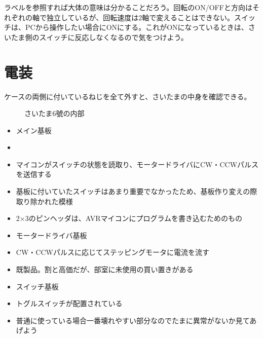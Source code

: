 \documentclass[letterpaper,10pt,dvipdfmx]{sphinxmanual}
\begin{document}
ラベルを参照すれば大体の意味は分かることだろう。回転のON/OFFと方向はそれぞれの軸で独立しているが、回転速度は2軸で変えることはできない。スイッチは、PCから操作したい場合にONにする。これがONになっているときは、さいたま側のスイッチに反応しなくなるので気をつけよう。


\section{電装}
\label{\detokenize{nissyu-idohen/saitama:id5}}
ケースの両側に付いているねじを全て外すと、さいたまの中身を確認できる。
\begin{figure}[htbp]
\centering
\capstart

\noindent{}
\caption{さいたま6號の内部}\label{\detokenize{nissyu-idohen/saitama:id11}}\end{figure}
\begin{itemize}
\item {} 
メイン基板

\item {} 

\item {} 
マイコンがスイッチの状態を読取り、モータードライバにCW・CCWパルスを送信する

\item {} 
基板に付いていたスイッチはあまり重要でなかったため、基板作り変えの際取り除かれた模様

\item {} 
2×3のピンヘッダは、AVRマイコンにプログラムを書き込むためのもの

\item {} 
モータードライバ基板

\item {} 
CW・CCWパルスに応じてステッピングモータに電流を流す

\item {} 
既製品。割と高価だが、部室に未使用の買い置きがある

\item {} 
スイッチ基板

\item {} 
トグルスイッチが配置されている

\item {} 
普通に使っている場合一番壊れやすい部分なのでたまに異常がないか見てあげよう

\end{itemize}
\end{document}
